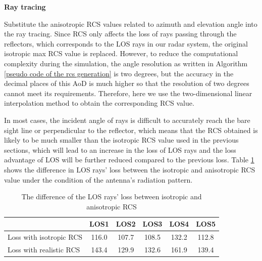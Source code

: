 \documentclass[12pt,DIV14,BCOR12mm,a4paper,footinclude=false,headinclude,parskip=half-,twoside,openright,cleardoublepage=empty,toc=index,bibliography=totoc,listof=totoc]{scrreprt}
\numberwithin{equation}{chapter}
\begin{document}
\begin{spacing}{1.5}
\textbf{\large{Ray tracing}}
\end{spacing}

Substitute the anisotropic RCS values related to azimuth and elevation angle into the ray tracing. Since RCS only affects the loss of rays passing through the reflectors, which corresponds to the LOS rays in our radar system, the original isotropic max RCS value is replaced. However, to reduce the computational complexity during the simulation, the angle resolution as written in Algorithm \ref{pseudo code of the rcs generation} is two degrees, but the accuracy in the decimal places of this AoD is much higher so that the resolution of two degrees cannot meet its requirements. Therefore, here we use the two-dimensional linear interpolation method to obtain the corresponding RCS value.

In most cases, the incident angle of rays is difficult to accurately reach the bare sight line or perpendicular to the reflector, which means that the RCS obtained is likely to be much smaller than the isotropic RCS value used in the previous sections, which will lead to an increase in the loss of LOS rays and the loss advantage of LOS will be further reduced compared to the previous loss. Table \ref{difference of the LOS rays' loss between isotropic RCS and realistic RCS} shows the difference in LOS rays' loss between the isotropic and anisotropic RCS value under the condition of the antenna's radiation pattern.

\begin{table}
    \centering
    \caption{The difference of the LOS rays' loss between isotropic and anisotropic RCS}
    \label{difference of the LOS rays' loss between isotropic RCS and realistic RCS}
    \begin{tabular}{lccccc}
        \hline
        \multicolumn{1}{l|}{} & \multicolumn{1}{c|}{LOS1} & \multicolumn{1}{c|}{LOS2} & \multicolumn{1}{c|}{LOS3} & \multicolumn{1}{c|}{LOS4} & \multicolumn{1}{c}{LOS5}\\
        \hline

        \multicolumn{1}{l|}{Loss with isotropic RCS} & \multicolumn{1}{c|}{116.0} & \multicolumn{1}{c|}{107.7} & \multicolumn{1}{c|}{108.5} & \multicolumn{1}{c|}{132.2} & \multicolumn{1}{c}{112.8}\\
        \hline

        \multicolumn{1}{l|}{Loss with realistic RCS} & \multicolumn{1}{c|}{143.4} & \multicolumn{1}{c|}{129.9} & \multicolumn{1}{c|}{132.6} & \multicolumn{1}{c|}{161.9} & \multicolumn{1}{c}{139.4}\\
        \hline
    \end{tabular}
\end{table}
\end{document}
